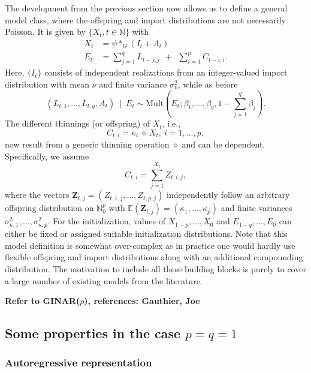 \documentclass{article}
\begin{document}
The development from the previous section now allows us to define a general model class, where the offspring and import distributions are not necessarily Poisson. It is given by  $\{X_t, t \in \mathbb{N}\}$ with
\begin{align}
X_t & = \psi *_G (I_t + A_t)\label{eq:X_general}\\
E_t & = \sum_{j = 1}^q L_{t - j, j} \ \ + \ \ \sum_{i = 1}^p C_{t - i, i}.\label{eq:E_general}
\end{align}
Here, $\{I_t\}$ consists of independent realizations from an integer-valued import distribution with mean $\nu$ and finite variance $\sigma^2_\nu$, while as before
$$
(L_{t, 1}, \dots, L_{t, q}, A_t) \ \mid \ E_t \sim \text{Mult}\left(E_t; \beta_1, \dots, \beta_q, 1 - \sum_{j = 1}^q \beta_j\right).
$$
The different thinnings (or offspring) of $X_t$, i.e.,
$$
C_{t, i} = \kappa_i \ \diamond \ X_t, \ i = 1, \dots, p,
$$
now result from a generic thinning operation $\diamond$ and can be dependent. Specifically, we assume
$$
C_{t, i} = \sum_{j = 1}^{X_t} Z_{t, i, j},
$$
where the vectors $\mathbf{Z}_{t, j} = (Z_{t, 1, j}, \dots, Z_{t, p, j})$ independently follow an arbitrary offspring distribution on $\mathbb{N}_0^p$ with $\mathbb{E}(\mathbf{Z}_{t, j}) = (\kappa_1, \dots, \kappa_p)$ and finite variances $\sigma^2_{\kappa, 1}, \dots, \sigma^2_{\kappa, p}$. For the initialization, values of $X_{1 - p}, \dots, X_0$ and $E_{1 - q}, \dots, E_0$ can either be fixed or assigned suitable initialization distributions. %
Note that this model definition is somewhat over-complex as in practice one would hardly use flexible offspring and import distributions along with an additional compounding distribution. The motivation to include all these building blocks is purely to cover a large number of existing models from the literature.

\textbf{Refer to GINAR($p$), references: Gauthier, Joe}

\subsection{Some properties in the case $p = q = 1$}
\label{eq:stochastic_properties_general}

\subsubsection{Autoregressive representation}
\label{subsubsec:AR}
\end{document}
